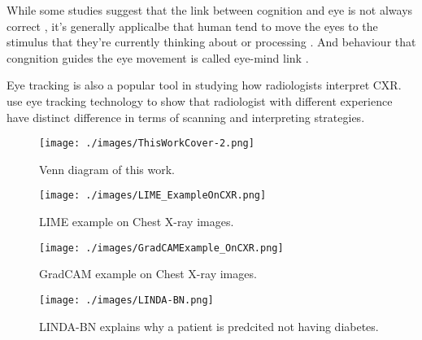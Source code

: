 While some studies suggest that the link between cognition and eye is not always correct \citep{Anderson2004EyeMovementNegativeSupport, Schall2014EyeTrackingIntro}, it's generally applicalbe that human tend to move the eyes to the stimulus that they're currently thinking about or processing \citep{Cater2020BestPracticeEyeTracking}. And behaviour that congnition guides the eye movement is called eye-mind link \citep{Reichle2012EyeMindLink1, Reichle2010EyeMindLink2}. 

Eye tracking is also a popular tool in studying how radiologists interpret CXR. \citet{Manning2003ExpreienceRadiologist} use eye tracking technology to show that radiologist with different experience have distinct difference in terms of scanning and interpreting strategies.





\begin{figure}[!h]
    \centering
    \texttt{[image: ./images/ThisWorkCover-2.png]}
    \caption{Venn diagram of this work.}
    \label{fig: this_work_cover}
\end{figure}

\begin{figure}[!h]
    \centering
    \texttt{[image: ./images/LIME\_ExampleOnCXR.png]}
    \caption{LIME example on Chest X-ray images. \citep{Teixeira2021LIMEAndGradCAMOnCXR}}
    \label{fig: LIME_ExampleOnCXR}
\end{figure}

\begin{figure}[!h]
    \centering
    \texttt{[image: ./images/GradCAMExample\_OnCXR.png]}
    \caption{GradCAM example on Chest X-ray images. \citep{Teixeira2021LIMEAndGradCAMOnCXR}}
    \label{fig: GradCAMExample_OnCXR}
\end{figure}

\begin{figure}[!h]
    \centering
    \texttt{[image: ./images/LINDA-BN.png]}
    \caption{LINDA-BN explains why a patient is predcited not having diabetes. \citep{Moreira2021LINDA}}
    \label{fig: LINDA-BN_diabetes}
\end{figure}






\lipsum[1]

